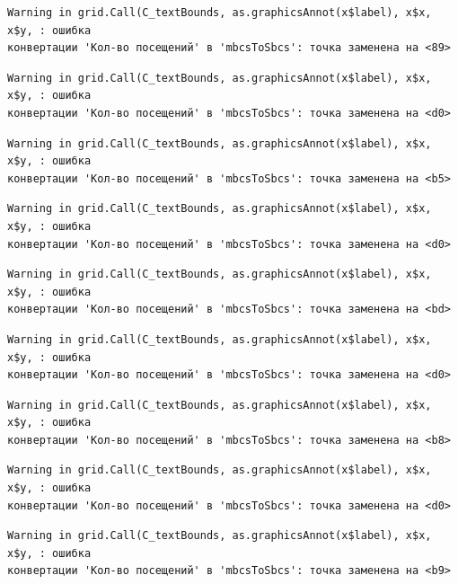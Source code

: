 \documentclass[
  letterpaper,
  DIV=11,
  numbers=noendperiod]{scrreprt}
\begin{document}
\begin{verbatim}
Warning in grid.Call(C_textBounds, as.graphicsAnnot(x$label), x$x, x$y, : ошибка
конвертации 'Кол-во посещений' в 'mbcsToSbcs': точка заменена на <89>
\end{verbatim}

\begin{verbatim}
Warning in grid.Call(C_textBounds, as.graphicsAnnot(x$label), x$x, x$y, : ошибка
конвертации 'Кол-во посещений' в 'mbcsToSbcs': точка заменена на <d0>
\end{verbatim}

\begin{verbatim}
Warning in grid.Call(C_textBounds, as.graphicsAnnot(x$label), x$x, x$y, : ошибка
конвертации 'Кол-во посещений' в 'mbcsToSbcs': точка заменена на <b5>
\end{verbatim}

\begin{verbatim}
Warning in grid.Call(C_textBounds, as.graphicsAnnot(x$label), x$x, x$y, : ошибка
конвертации 'Кол-во посещений' в 'mbcsToSbcs': точка заменена на <d0>
\end{verbatim}

\begin{verbatim}
Warning in grid.Call(C_textBounds, as.graphicsAnnot(x$label), x$x, x$y, : ошибка
конвертации 'Кол-во посещений' в 'mbcsToSbcs': точка заменена на <bd>
\end{verbatim}

\begin{verbatim}
Warning in grid.Call(C_textBounds, as.graphicsAnnot(x$label), x$x, x$y, : ошибка
конвертации 'Кол-во посещений' в 'mbcsToSbcs': точка заменена на <d0>
\end{verbatim}

\begin{verbatim}
Warning in grid.Call(C_textBounds, as.graphicsAnnot(x$label), x$x, x$y, : ошибка
конвертации 'Кол-во посещений' в 'mbcsToSbcs': точка заменена на <b8>
\end{verbatim}

\begin{verbatim}
Warning in grid.Call(C_textBounds, as.graphicsAnnot(x$label), x$x, x$y, : ошибка
конвертации 'Кол-во посещений' в 'mbcsToSbcs': точка заменена на <d0>
\end{verbatim}

\begin{verbatim}
Warning in grid.Call(C_textBounds, as.graphicsAnnot(x$label), x$x, x$y, : ошибка
конвертации 'Кол-во посещений' в 'mbcsToSbcs': точка заменена на <b9>
\end{verbatim}
\end{document}

